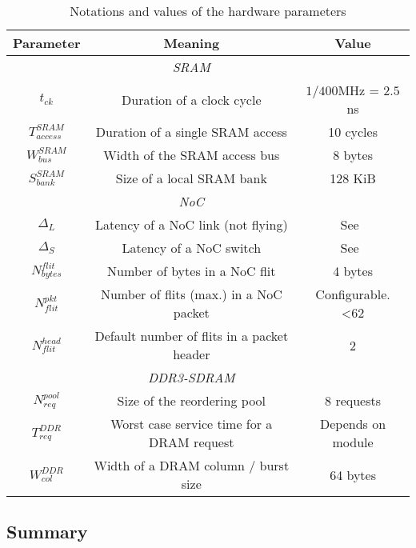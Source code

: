 \documentclass[main.tex]{subfiles}
\begin{document}
\begin{table}
\begin{center}
    \begin{tabular*}{0.95\linewidth}{@{\extracolsep{\fill}} c c c}
	\hline
        {\sc \textbf{Parameter}} 	& {\sc \textbf{Meaning}} & \textbf{\sc \textbf{Value}} 	\\
	    \hline
         & \emph{SRAM} & \\
        \hline
        $t_{ck}$ & Duration of a clock cycle & $1 / 400$MHz = $2.5$ns \\
        $T_{access}^{SRAM}$ & Duration of a single SRAM access & 10 cycles \\
        $W_{bus}^{SRAM}$ & Width of the SRAM access bus & 8 bytes \\
        $S_{bank}^{SRAM}$ & Size of a local SRAM bank & 128 KiB \\
	    \hline
         & \emph{NoC} & \\
        \hline
        $\Delta_L$ & Latency of a NoC link (not flying) &  See~\cite{kalray_mppa}\\
        $\Delta_S$ & Latency of a NoC switch & See~\cite{kalray_mppa}\\
        $N_{bytes}^{flit}$ & Number of bytes in a NoC flit & 4 bytes \\
        $N_{flit}^{pkt}$ & Number of flits (max.) in a NoC packet & Configurable. <62 \\
        $N_{flit}^{head}$ & Default number of flits in a packet header & 2 \\
	    \hline
         & \emph{DDR3-SDRAM} & \\
        \hline
        $N_{req}^{pool}$ & Size of the reordering pool & 8 requests \\
        $T_{req}^{DDR}$ & Worst case service time for a DRAM request &  Depends on module \\
        $W_{col}^{DDR}$ & Width of a DRAM column / burst size & 64 bytes \\
        \hline	
\end{tabular*}
\end{center}
\caption{Notations and values of the \mppalong hardware parameters}
\label{table_execModel_MPPAhwParams}
\end{table}






\subsection{Summary}
\end{document}
